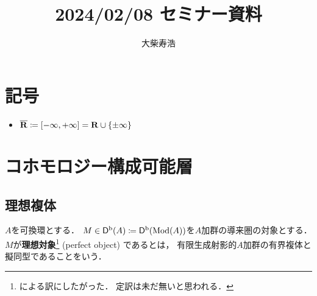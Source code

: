 
\def\inner<#1>{\langle #1 \rangle}








\title{2024/02/08 セミナー資料}
\author{大柴寿浩}
\date{}

\maketitle

\section*{記号}
\begin{itemize}
    \item \(\overline{\mathbf{R}}\coloneqq \left[-\infty,+\infty\right]=\mathbf{R}\cup\{\pm\infty\}\)
\end{itemize}
\section{コホモロジー構成可能層}
\subsection{理想複体}
\(A\)を可換環とする．
\(M\in\mathop{\mathsf{D}^\mathrm{b}}\nolimits(A)\coloneqq \mathop{\mathsf{D}^\mathrm{b}}\nolimits(\mathop{\mathrm{Mod}}\nolimits(A))\)を\(A\)加群の導来圏の対象とする．
\(M\)が\textbf{理想対象}\footnote{
    \cite{Ue}による訳にしたがった．
    定訳は未だ無いと思われる．
} (perfect object) であるとは，
有限生成射影的\(A\)加群の有界複体と擬同型であることをいう．

